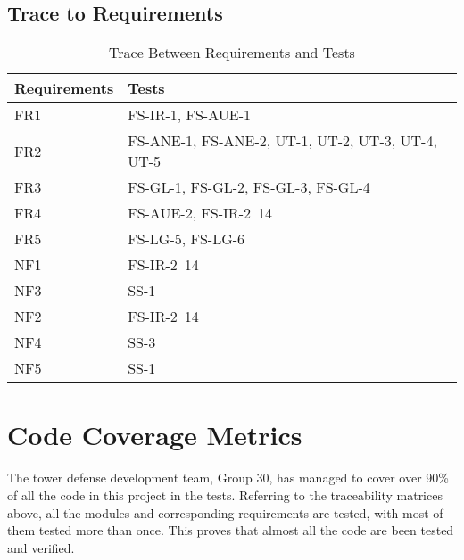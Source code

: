 \documentclass[12pt]{article}
\begin{document}
\subsection{Trace to Requirements}
    \FloatBarrier
        \begin{table}[!htbp]
        \begin{tabular}{ll}
        \toprule
        Requirements & Tests \\
        \midrule
        FR1 & FS-IR-1, FS-AUE-1\\
        FR2 & FS-ANE-1, FS-ANE-2, UT-1, UT-2, UT-3, UT-4, UT-5\\
        FR3 & FS-GL-1, FS-GL-2, FS-GL-3, FS-GL-4\\
        FR4 & FS-AUE-2, FS-IR-2~14\\
        FR5 & FS-LG-5, FS-LG-6\\
        NF1 & FS-IR-2~14\\
        NF3 & SS-1\\
        NF2 & FS-IR-2~14\\
        NF4 & SS-3\\
        NF5 & SS-1\\
    
        \bottomrule
        \end{tabular}
        \caption{Trace Between Requirements and Tests}
        \makeatletter
           \def\rulecolor#1#{\CT@arc{#1}}
           \def\CT@arc#1#2{%
           \ifdim\baselineskip=\z@\noalign\fi
           {\gdef\CT@arc@{\color#1{#2}}}}
           \let\CT@arc@\relax
        \makeatother
        \label{Table 3}
        \end{table}
\FloatBarrier

\section{Code Coverage Metrics}
The tower defense development team, Group 30, has managed to cover over 90\% of all the code in this project in the tests. Referring to the traceability matrices above, all the modules and corresponding requirements are tested, with most of them tested more than once. This proves that almost all the code are been tested and verified. 
\end{document}
